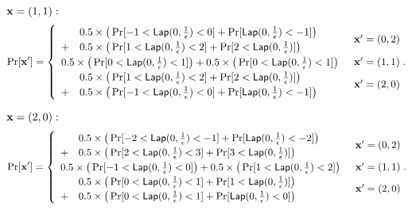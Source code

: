 \documentclass{article}
\begin{document}
{{\noindent $\textbf{x} = (1,1):$
\[
\Pr[\textbf{x}']
= \begin{cases}
\begin{array}{ll}
 	& 0.5 \times 
 	\big(
 	\Pr[	-1	< \mathsf{Lap}(0, \frac{1}{\epsilon})	<	0] 
 	+ 
 	\Pr[	\mathsf{Lap}(0, \frac{1}{\epsilon})			<	-1] 
 	\big) \\
 	+ 	
 	& 0.5 \times 
 	\big(
 	\Pr[	1	< \mathsf{Lap}(0, \frac{1}{\epsilon})	<	2] 
 	+ 
 	\Pr[	2 	< \mathsf{Lap}(0, \frac{1}{\epsilon})] 
 	\big) 
\end{array} 
	& \textbf{x}' = (0, 2)\\
\begin{array}{ll}
 	0.5 \times 
 	\big(
 	\Pr[	0	< \mathsf{Lap}(0, \frac{1}{\epsilon})	<	1] 
 	\big)
 	+ 	
 	0.5 \times 
 	\big(
 	\Pr[	0	< \mathsf{Lap}(0, \frac{1}{\epsilon})	<	1] 
 	\big) 
\end{array}  
	& \textbf{x}' = (1, 1)\\
\begin{array}{ll}
 	& 0.5 \times 
 	\big(
 	\Pr[	1	<	\mathsf{Lap}(0, \frac{1}{\epsilon})	<	2] 
 	+ 
 	\Pr[	2	<	\mathsf{Lap}(0, \frac{1}{\epsilon})]
 	\big) \\
 	+ 	
 	& 0.5 \times 
 	\big(
 	\Pr[	-1	< \mathsf{Lap}(0, \frac{1}{\epsilon})	<	0] 
 	+ 
 	\Pr[	\mathsf{Lap}(0, \frac{1}{\epsilon})			<	-1] 
 	\big) 
\end{array}  
& \textbf{x}' = (2, 0)
\end{cases}.
\]

\noindent $\textbf{x} = (2,0):$
\[
\Pr[\textbf{x}']
= \begin{cases}
\begin{array}{ll}
 	& 0.5 \times 
 	\big(
 	\Pr[	-2	< \mathsf{Lap}(0, \frac{1}{\epsilon})	<	-1] 
 	+ 
 	\Pr[	\mathsf{Lap}(0, \frac{1}{\epsilon})			< 	-2] 
 	\big) \\
 	+ 	
 	& 0.5 \times 
 	\big(
 	\Pr[	2	< \mathsf{Lap}(0, \frac{1}{\epsilon})	<	3] 
 	+ 
 	\Pr[	3	< \mathsf{Lap}(0, \frac{1}{\epsilon})] 
 	\big) 
\end{array} 
	& \textbf{x}' = (0, 2)\\
\begin{array}{ll}
 	0.5 \times 
 	\big(
 	\Pr[	-1	< \mathsf{Lap}(0, \frac{1}{\epsilon})	<	0] 
 	\big)
 	+ 	
 	0.5 \times 
 	\big(
 	\Pr[	1	< \mathsf{Lap}(0, \frac{1}{\epsilon})	<	2] 
 	\big) 
\end{array}  
	& \textbf{x}' = (1, 1)\\
\begin{array}{ll}
 	& 0.5 \times 
 	\big(
 	\Pr[	0	<	\mathsf{Lap}(0, \frac{1}{\epsilon})	<	1] 
 	+ 
 	\Pr[	1	<	\mathsf{Lap}(0, \frac{1}{\epsilon})]
 	\big) \\
 	+ 	
 	& 0.5 \times 
 	\big(
 	\Pr[	0	< \mathsf{Lap}(0, \frac{1}{\epsilon})	<	1] 
 	+ 
 	\Pr[	\mathsf{Lap}(0, \frac{1}{\epsilon})			<	0] 
 	\big) 
\end{array}  
& \textbf{x}' = (2, 0)
\end{cases}.
\]
}

}
\end{document}
